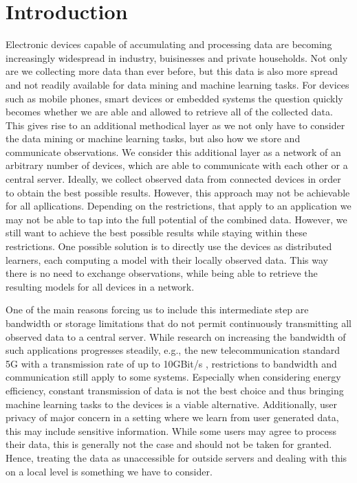 \chapter{Introduction}
Electronic devices capable of accumulating and processing data are becoming increasingly widespread in industry, buisinesses and private households.
Not only are we collecting more data than ever before, but this data is also more spread and not readily available for data mining and machine learning tasks.
For devices such as mobile phones, smart devices or embedded systems the question quickly becomes whether we are able and allowed to retrieve all of the collected data.
This gives rise to an additional methodical layer as we not only have to consider the data mining or machine learning tasks, but also how we store and communicate observations.
We consider this additional layer as a network of an arbitrary number of devices, which are able to communicate with each other or a central server.
Ideally, we collect observed data from connected devices in order to obtain the best possible results.
However, this approach may not be achievable for all apllications.
Depending on the restrictions, that apply to an application we may not be able to tap into the full potential of the combined data.
However, we still want to achieve the best possible results while staying within these restrictions.
One possible solution is to directly use the devices as distributed learners, each computing a model with their locally observed data.
This way there is no need to exchange observations, while being able to retrieve the resulting models for all devices in a network.

One of the main reasons forcing us to include this intermediate step are bandwidth or storage limitations that do not permit continuously transmitting all observed data to a central server.
While research on increasing the bandwidth of such applications progresses steadily, e.g., the new telecommunication standard 5G with a transmission rate of up to 10GBit/s \cite{nordrum2017ieee},   restrictions to bandwidth and communication still apply to some systems. 
Especially when considering energy efficiency, constant transmission of data is not the best choice and thus bringing machine learning tasks to the devices is a viable alternative.
Additionally, user privacy of major concern in a setting where we learn from user generated data, this may include sensitive information.
While some users may agree to process their data, this is generally not the case and should not be taken for granted. 
Hence, treating the data as unaccessible for outside servers and dealing with this on a local level is something we have to consider.

